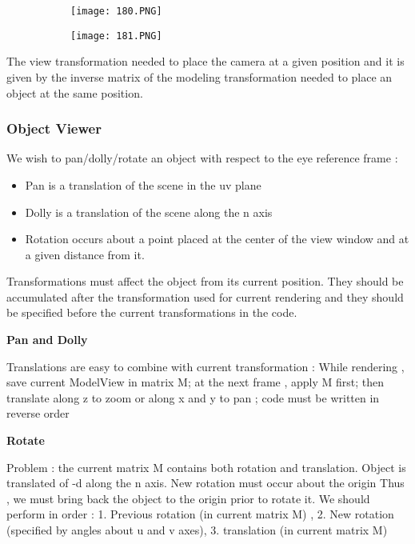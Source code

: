 \documentclass{article}
\begin{document}
\begin{figure}[ht!]
  \centering
  \begin{subfigure}[b]{0.4\linewidth}
    \texttt{[image: 180.PNG]}
  \end{subfigure}
  \begin{subfigure}[b]{0.4\textwidth}
         \centering
         \texttt{[image: 181.PNG]}
     \end{subfigure}
\end{figure}

The view transformation needed to place the camera at a given position and it is given by the inverse 
matrix of the modeling transformation needed to place an object at the same position.



\subsubsection{Object Viewer}

We wish to pan/dolly/rotate an object with respect to the eye reference frame :
\begin{itemize}
    \item Pan is a translation of the scene in the uv plane
    \item Dolly is a translation of the scene along the n axis
    \item Rotation occurs about a point placed at the center of the view window and at a given distance from it.
\end{itemize}

Transformations must affect the object from its current position. They should be accumulated after the transformation used for current rendering and they should be specified before the current transformations in the code.

\vspace{3mm}
\textbf{Pan and Dolly}

Translations are easy to combine with current transformation : While rendering , save current ModelView in matrix M; at the next frame , apply M first; then translate along z to zoom or along x and y to pan ; code must be written in reverse order

\vspace{3mm}
\textbf{Rotate}

Problem : the current matrix M contains both rotation and translation.
Object is translated of -d along the n axis.
New rotation must occur about the origin
Thus , we must bring back the object to the origin prior to rotate it.
We should perform in order : 1. Previous rotation (in current matrix M) , 2. New rotation (specified by 
angles about u and v axes), 3. translation (in current matrix M)
\end{document}
